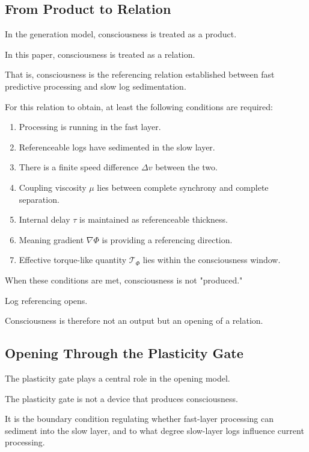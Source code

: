 \subsection{From Product to Relation}


In the generation model, consciousness is treated as a product.

In this paper, consciousness is treated as a relation.

That is, consciousness is the referencing relation established between fast predictive processing and slow log sedimentation.

For this relation to obtain, at least the following conditions are required:

\begin{enumerate}
\item Processing is running in the fast layer.
\item Referenceable logs have sedimented in the slow layer.
\item There is a finite speed difference $\Delta v$ between the two.
\item Coupling viscosity $\mu$ lies between complete synchrony and complete separation.
\item Internal delay $\tau$ is maintained as referenceable thickness.
\item Meaning gradient $\nabla\Phi$ is providing a referencing direction.
\item Effective torque-like quantity $\mathcal{T}_{\Phi}$ lies within the consciousness window.
\end{enumerate}

When these conditions are met, consciousness is not "produced."

Log referencing opens.

Consciousness is therefore not an output but an opening of a relation.

\subsection{Opening Through the Plasticity Gate}


The plasticity gate plays a central role in the opening model.

The plasticity gate is not a device that produces consciousness.

It is the boundary condition regulating whether fast-layer processing can sediment into the slow layer, and to what degree slow-layer logs influence current processing.

